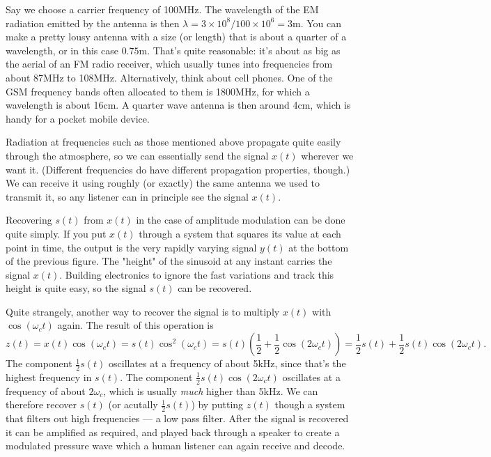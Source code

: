 \documentclass[10pt]{beamer}
\begin{document}
Say we choose a carrier frequency of 100MHz.  The wavelength of the EM radiation emitted by the antenna is then $\lambda = 3 \times 10^8/100 \times 10^6 = 3$m.  You can make a pretty lousy antenna with a size (or length) that is about a quarter of a wavelength, or in this case $0.75$m.  That's quite reasonable:  it's about as big as the aerial of an FM radio receiver, which usually tunes into frequencies from about 87MHz to 108MHz.  Alternatively, think about cell phones.  One of the GSM frequency bands often allocated to them is 1800MHz, for which a wavelength is about 16cm.  A quarter wave antenna is then around 4cm, which is handy for a pocket mobile device.  

Radiation at frequencies such as those mentioned above propagate quite easily through the atmosphere, so we can essentially send the signal $x(t)$ wherever we want it.  (Different frequencies do have different propagation properties, though.)  We can receive it using roughly (or exactly) the same antenna we used to transmit it, so any listener can in principle see the signal $x(t)$.  

Recovering $s(t)$ from $x(t)$ in the case of amplitude modulation can be done quite simply.  If you put $x(t)$ through a system that squares its value at each point in time, the output is the very rapidly varying signal $y(t)$ at the bottom of the previous figure.  The "height" of the sinusoid at any instant carries the signal $x(t)$.  Building electronics to ignore the fast variations and track this height is quite easy, so the signal $s(t)$ can be recovered.

Quite strangely, another way to recover the signal is to multiply $x(t)$ with $\cos(\omega_c t)$ again.  The result of this operation is
\begin{equation*}
  z(t) = x(t) \cos(\omega_c t) = s(t) \cos^2(\omega_c t) = s(t) \left( \frac{1}{2} + \frac{1}{2} \cos(2 \omega_c t) \right)
  = \frac{1}{2} s(t) + \frac{1}{2} s(t) \cos(2 \omega_c t).
\end{equation*}
The component $\frac{1}{2} s(t)$ oscillates at a frequency of about 5kHz, since that's the highest frequency in $s(t)$.  The component $\frac{1}{2} s(t) \cos(2 \omega_c t)$ oscillates at a frequency of about $2 \omega_c$, which is usually {\em much} higher than 5kHz.  We can therefore recover $s(t)$ (or acutally $\frac{1}{2} s(t)$) by putting $z(t)$ though a system that filters out high frequencies --- a low pass filter.  After the signal is recovered it can be amplified as required, and played back through a speaker to create a modulated pressure wave which a human listener can again receive and decode.  
\end{document}

